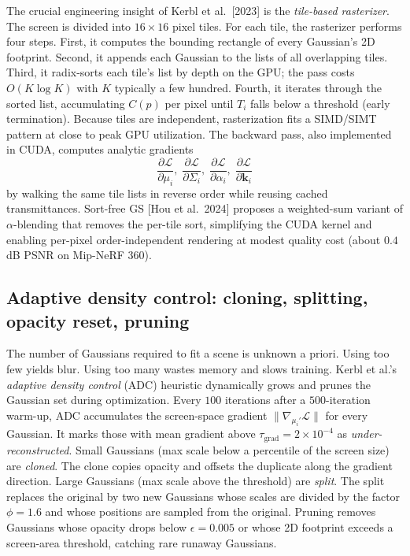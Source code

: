 \documentclass{article}
\begin{document}
The crucial engineering insight of Kerbl et al.~{[}2023{]} is the \emph{tile-based rasterizer}. The screen is divided into \(16{\times}16\) pixel tiles. For each tile, the rasterizer performs four steps. First, it computes the bounding rectangle of every Gaussian's 2D footprint. Second, it appends each Gaussian to the lists of all overlapping tiles. Third, it radix-sorts each tile's list by depth on the GPU; the pass costs \(O(K\log K)\) with \(K\) typically a few hundred. Fourth, it iterates through the sorted list, accumulating \(C(p)\) per pixel until \(T_i\) falls below a threshold (early termination). Because tiles are independent, rasterization fits a SIMD/SIMT pattern at close to peak GPU utilization. The backward pass, also implemented in CUDA, computes analytic gradients
\[\frac{\partial \mathcal{L}}{\partial \mu_i},\;\frac{\partial \mathcal{L}}{\partial \Sigma_i},\;\frac{\partial \mathcal{L}}{\partial \alpha_i},\;\frac{\partial \mathcal{L}}{\partial \mathbf{k}_i}\]
by walking the same tile lists in reverse order while reusing cached transmittances. Sort-free GS {[}Hou et al.~2024{]} proposes a weighted-sum variant of \(\alpha\)-blending that removes the per-tile sort, simplifying the CUDA kernel and enabling per-pixel order-independent rendering at modest quality cost (about \(0.4\) dB PSNR on Mip-NeRF 360).

\subsection{Adaptive density control: cloning, splitting, opacity reset, pruning}\label{adaptive-density-control-cloning-splitting-opacity-reset-pruning}

The number of Gaussians required to fit a scene is unknown a priori. Using too few yields blur. Using too many wastes memory and slows training. Kerbl et al.'s \emph{adaptive density control} (ADC) heuristic dynamically grows and prunes the Gaussian set during optimization. Every \(100\) iterations after a \(500\)-iteration warm-up, ADC accumulates the screen-space gradient \(\|\nabla_{\mu_i'}\mathcal{L}\|\) for every Gaussian. It marks those with mean gradient above \(\tau_{\mathrm{grad}}=2\times 10^{-4}\) as \emph{under-reconstructed}. Small Gaussians (max scale below a percentile of the screen size) are \emph{cloned}. The clone copies opacity and offsets the duplicate along the gradient direction. Large Gaussians (max scale above the threshold) are \emph{split}. The split replaces the original by two new Gaussians whose scales are divided by the factor \(\phi=1.6\) and whose positions are sampled from the original. Pruning removes Gaussians whose opacity drops below \(\epsilon=0.005\) or whose 2D footprint exceeds a screen-area threshold, catching rare runaway Gaussians.
\end{document}
